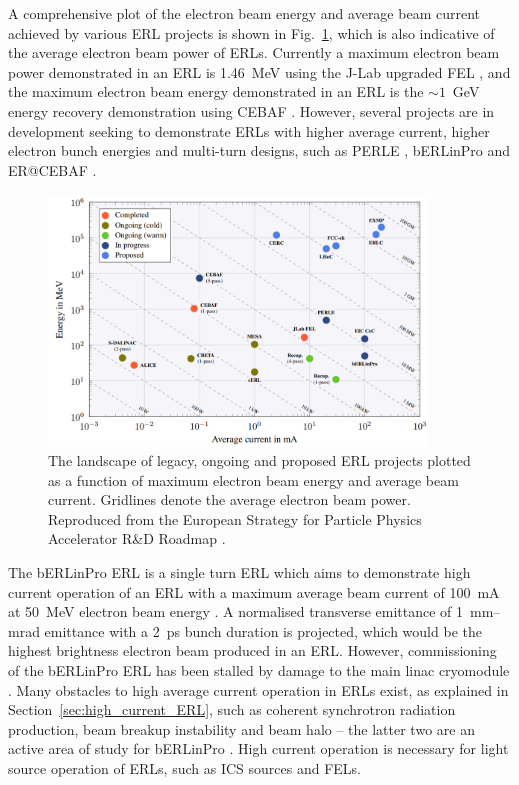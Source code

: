 \documentclass[../main.tex]{subfiles}
\begin{document}
A comprehensive plot of the electron beam energy and average beam current achieved by various ERL projects is shown in Fig.~\ref{fig:ERL_Landscape}, which is also indicative of the average electron beam power of ERLs. Currently a maximum electron beam power demonstrated in an ERL is 1.46~\si{\mega\electronvolt} using the J-Lab upgraded FEL \cite{neil2006jlab}, and the maximum electron beam energy demonstrated in an ERL is the $\sim1$~\si{\giga\electronvolt} energy recovery demonstration using CEBAF \cite{bogacz2003cebaf,tennant2003beam}. However, several projects are in development seeking to demonstrate ERLs with higher average current, higher electron bunch energies and multi-turn designs, such as PERLE \cite{angal2018perle}, bERLinPro \cite{kuske2012conceptual} and ER@CEBAF \cite{meot2016er}.

\begin{figure}[!h]
\centering
\includegraphics[width=0.9\textwidth]{Figures/CBETA_Multi-Pass_Commissioning/Tennant_ERL_Landscape.pdf}
\caption{The landscape of legacy, ongoing and proposed ERL projects plotted as a function of maximum electron beam energy and average beam current. Gridlines denote the average electron beam power. Reproduced from the European Strategy for Particle Physics
Accelerator R&D Roadmap \cite{adolphsen2022european}.}
\label{fig:ERL_Landscape}
\end{figure}

The bERLinPro ERL is a single turn ERL which aims to demonstrate high current operation of an ERL with a maximum average beam current of 100~\si{\milli\ampere} at 50~\si{\mega\electronvolt} electron beam energy \cite{kuske2012conceptual,neumann2018berlinpro}. A normalised transverse emittance of 1~\si{\milli\meter}--\si{\milli\radian} emittance with a 2~\si{\pico\second} bunch duration is projected, which would be the highest brightness electron beam produced in an ERL. However, commissioning of the bERLinPro ERL has been stalled by damage to the main linac cryomodule \cite{neumann2018berlinpro}. Many obstacles to high average current operation in ERLs exist, as explained in Section~\ref{sec:high_current_ERL}, such as coherent synchrotron radiation production, beam breakup instability and beam halo -- the latter two are an active area of study for bERLinPro \cite{neumann2012status,hwang2019first}. High current operation is necessary for light source operation of ERLs, such as ICS sources and FELs.  
\end{document}
